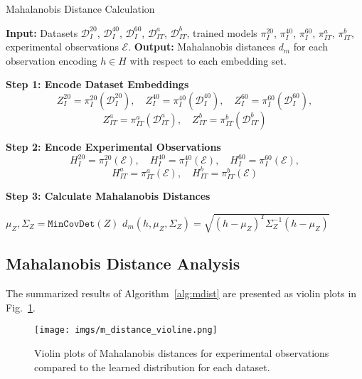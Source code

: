 \begin{algorithm}
\caption{Mahalanobis Distance Calculation}
\label{alg:mdist}
\begin{algorithmic}[1]
    \State \textbf{Input:} Datasets $\mathcal{D}_I^{20}$, $\mathcal{D}_I^{40}$, $\mathcal{D}_I^{60}$, $\mathcal{D}_{IT}^a$, $\mathcal{D}_{IT}^b$, 
    \Statex \hspace{2em} trained models $\pi_{I}^{20}$, $\pi_{I}^{40}$, $\pi_{I}^{60}$, $\pi_{IT}^a$, $\pi_{IT}^b$, 
    \Statex \hspace{2em} experimental observations $\mathcal{E}$.
    \State \textbf{Output:} Mahalanobis distances $d_m$ for each observation encoding $h \in H$ with respect to each embedding set.

    \State \textbf{Step 1: Encode Dataset Embeddings} 
    \State     \[
    Z_I^{20} = \pi_{I}^{20}(\mathcal{D}_I^{20}), \quad Z_I^{40} = \pi_{I}^{40}(\mathcal{D}_I^{40}), \quad Z_I^{60} = \pi_{I}^{60}(\mathcal{D}_I^{60}), 
    \]
    \[
    Z_{IT}^a = \pi_{IT}^a(\mathcal{D}_{IT}^a), \quad Z_{IT}^b = \pi_{IT}^b(\mathcal{D}_{IT}^b)
    \]

    \State \textbf{Step 2: Encode Experimental Observations}
    \State     \[
    H_I^{20} = \pi_{I}^{20}(\mathcal{E}), \quad H_I^{40} = \pi_{I}^{40}(\mathcal{E}), \quad H_I^{60} = \pi_{I}^{60}(\mathcal{E}), 
    \]
    \[
    H_{IT}^a = \pi_{IT}^a(\mathcal{E}), \quad H_{IT}^b = \pi_{IT}^b(\mathcal{E})
    \]

    \State \textbf{Step 3: Calculate Mahalanobis Distances}
    
        \State $\mu_Z, \Sigma_Z = \texttt{MinCovDet}(Z)$
                \State
                $d_m(h, \mu_Z, \Sigma_Z) = \sqrt{(h - \mu_Z)^T \Sigma_Z^{-1} (h - \mu_Z)}$
            \EndFor
    \EndFor
\end{algorithmic}
\end{algorithm}

\subsection{Mahalanobis Distance Analysis}

The summarized results of Algorithm~\ref{alg:mdist} are presented as violin plots in Fig.~\ref{fig:m_distance_violine}.

\begin{figure}[t] \centering \texttt{[image: imgs/m\_distance\_violine.png]} \caption{Violin plots of Mahalanobis distances for experimental observations compared to the learned distribution for each dataset.} \label{fig:m_distance_violine} \end{figure}

